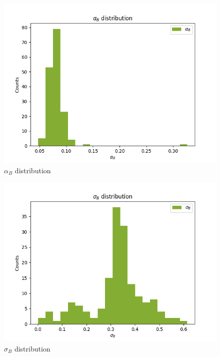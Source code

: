\documentclass[
]{article}
\begin{document}
\begin{figure}
\centering
\includegraphics{pngplots/param6.png}
\caption{\(\alpha_B\) distribution}
\end{figure}

\begin{figure}
\centering
\includegraphics{pngplots/param7.png}
\caption{\(\sigma_B\) distribution}
\end{figure}
\end{document}
